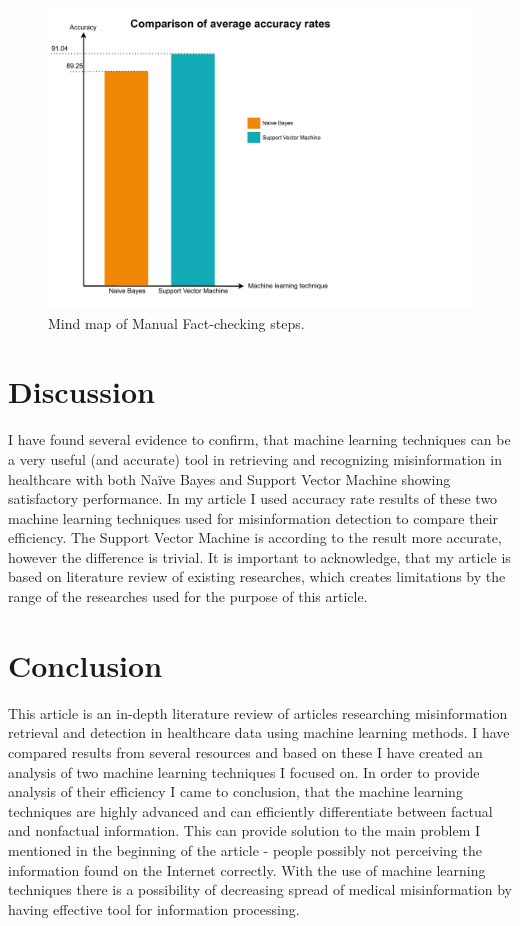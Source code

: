 \documentclass[11pt ,english,a4paper]{article}
\begin{document}
\begin{figure}[H]
\centering
\includegraphics[scale=0.5]{average_accuracy.pdf}
\caption{Mind map of Manual Fact-checking steps.}
\label{f:average}
\end{figure}


\section{Discussion}

I have found several evidence to confirm, that machine learning techniques can be a very useful (and accurate) tool in retrieving and recognizing misinformation in healthcare with both Naïve Bayes and Support Vector Machine showing satisfactory performance. In my article I used accuracy rate results of these two machine learning techniques used for misinformation detection to compare their efficiency. The Support Vector Machine is according to the result more accurate, however the difference is trivial. It is important to acknowledge, that my article is based on literature review of existing researches, which creates limitations by the range of the researches used for the purpose of this article.

\section{Conclusion}\label{conclusion}

This article is an in-depth literature review of articles researching misinformation retrieval and detection in healthcare data using machine learning methods. I have compared results from several resources and based on these I have created an analysis of two machine learning techniques I focused on. In order to provide analysis of their efficiency I came to conclusion, that the machine learning techniques are highly advanced and can efficiently differentiate between factual and nonfactual information. This can provide solution to the main problem I mentioned in the beginning of the article - people possibly not perceiving the information found on the Internet correctly. With the use of machine learning techniques there is a possibility of decreasing spread of medical misinformation by having effective tool for information processing.

\newpage

\end{document}
